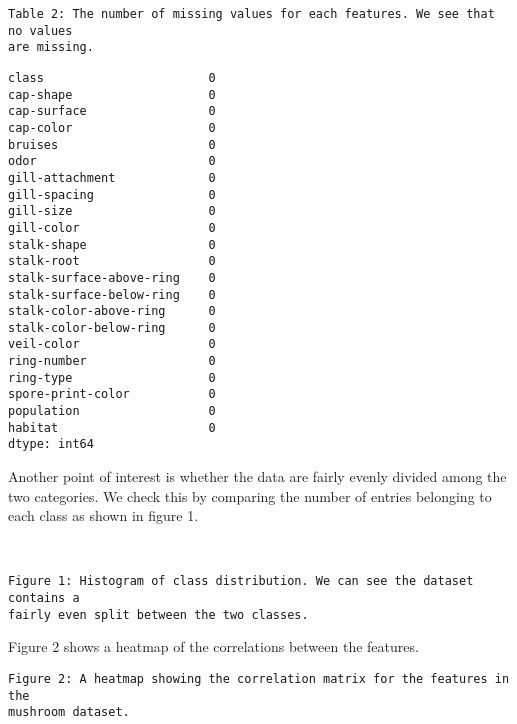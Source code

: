 \documentclass[11pt]{article}
\makeatletter
\newcommand{\boxspacing}{\kern\kvtcb@left@rule\kern\kvtcb@boxsep}
\newcommand{\prompt}[4]{
        {\ttfamily\llap{{\color{#2}[#3]:\hspace{3pt}#4}}\vspace{-\baselineskip}}
    }
\makeatother
\begin{document}
    \begin{Verbatim}[commandchars=\\\{\}]
Table 2: The number of missing values for each features. We see that no values
are missing.
    \end{Verbatim}

            \begin{tcolorbox}[breakable, size=fbox, boxrule=.5pt, pad at break*=1mm, opacityfill=0]
\prompt{Out}{outcolor}{90}{\boxspacing}
\begin{Verbatim}[commandchars=\\\{\}]
class                       0
cap-shape                   0
cap-surface                 0
cap-color                   0
bruises                     0
odor                        0
gill-attachment             0
gill-spacing                0
gill-size                   0
gill-color                  0
stalk-shape                 0
stalk-root                  0
stalk-surface-above-ring    0
stalk-surface-below-ring    0
stalk-color-above-ring      0
stalk-color-below-ring      0
veil-color                  0
ring-number                 0
ring-type                   0
spore-print-color           0
population                  0
habitat                     0
dtype: int64
\end{Verbatim}
\end{tcolorbox}
        
    Another point of interest is whether the data are fairly evenly divided
among the two categories. We check this by comparing the number of
entries belonging to each class as shown in figure 1.


    \begin{center}
    \end{center}
    { \hspace*{\fill} \\}
    
    \begin{Verbatim}[commandchars=\\\{\}]
Figure 1: Histogram of class distribution. We can see the dataset contains a
fairly even split between the two classes.
    \end{Verbatim}

    Figure 2 shows a heatmap of the correlations between the features.


    \begin{Verbatim}[commandchars=\\\{\}]
Figure 2: A heatmap showing the correlation matrix for the features in the
mushroom dataset.
    \end{Verbatim}
\end{document}
